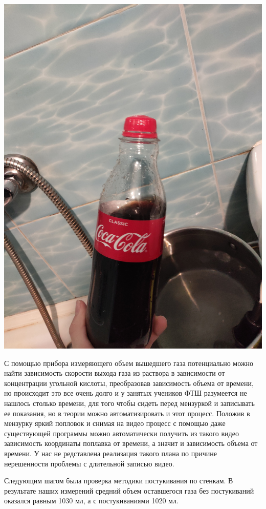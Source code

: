 \documentclass[12pt,a4paper]{scrartcl}
\begin{document}
\begin{flushleft}
\includegraphics[scale=0.2]{Boom}
\end{flushleft}

С помощью прибора измеряющего объем вышедшего газа потенциально можно найти зависимость скорости выхода газа из раствора в зависимости от концентрации угольной кислоты, преобразовав зависимость объема от времени, но происходит это все очень долго и у занятых учеников ФТШ разумеется не нашлось столько времени, для того чтобы сидеть перед мензуркой и записывать ее показания, но в теории можно автоматизировать и этот процесс. Положив в мензурку яркий попловок и снимая на видео процесс с помощью даже существующей программы можно автоматически получить из такого видео зависимость координаты поплавка от времени, а значит и зависимость объема от времени. У нас не редставлена реализация такого плана по причине нерешенности проблемы с длительной записью видео.

Следующим шагом была проверка методики постукивания по стенкам. 
В результате наших измерений средний объем оставшегося газа без постукиваний оказался равным 1030 мл, а с постукиваниями 1020 мл. 
\end{document}
